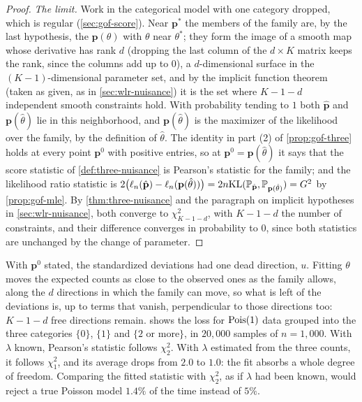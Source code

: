 \begin{proof}
\textit{The limit.}
Work in the categorical model with one category dropped, which is regular (\cref{sec:gof-score}).
Near $\mathbf{p}^*$ the members of the family are, by the last hypothesis, the $\mathbf{p}(\theta)$ with $\theta$ near $\theta^*$; they form the image of a smooth map whose derivative has rank $d$ (dropping the last column of the $d \times K$ matrix keeps the rank, since the columns add up to $0$), a $d$-dimensional surface in the $(K-1)$-dimensional parameter set, and by the implicit function theorem (taken as given, as in \cref{sec:wlr-nuisance}) it is the set where $K - 1 - d$ independent smooth constraints hold.
With probability tending to $1$ both $\hat{\mathbf{p}}$ and $\mathbf{p}(\hat{\theta})$ lie in this neighborhood, and $\mathbf{p}(\hat{\theta})$ is the maximizer of the likelihood over the family, by the definition of $\hat{\theta}$.
The identity in part (2) of \cref{prop:gof-three} holds at every point $\mathbf{p}^0$ with positive entries, so at $\mathbf{p}^0 = \mathbf{p}(\hat{\theta})$ it says that the score statistic of \cref{def:three-nuisance} is Pearson's statistic for the family; and the likelihood ratio statistic is $2\big(\ell_n(\hat{\mathbf{p}}) - \ell_n(\mathbf{p}(\hat{\theta}))\big) = 2n\mathrm{KL}(\mathbb{P}_{\hat{\mathbf{p}}}, \mathbb{P}_{\mathbf{p}(\hat{\theta})}) = G^2$ by \cref{prop:gof-mle}.
By \cref{thm:three-nuisance} and the paragraph on implicit hypotheses in \cref{sec:wlr-nuisance}, both converge to $\chi^2_{K-1-d}$, with $K - 1 - d$ the number of constraints, and their difference converges in probability to $0$, since both statistics are unchanged by the change of parameter.
\end{proof}

\begin{intuition}
With $\mathbf{p}^0$ stated, the standardized deviations had one dead direction, $u$.
Fitting $\theta$ moves the expected counts as close to the observed ones as the family allows, along the $d$ directions in which the family can move, so what is left of the deviations is, up to terms that vanish, perpendicular to those directions too: $K - 1 - d$ free directions remain.
 shows the loss for $\text{Pois}(1)$ data grouped into the three categories $\{0\}$, $\{1\}$ and $\{2 \text{ or more}\}$, in $20{,}000$ samples of $n = 1{,}000$.
With $\lambda$ known, Pearson's statistic follows $\chi^2_2$.
With $\lambda$ estimated from the three counts, it follows $\chi^2_1$, and its average drops from $2.0$ to $1.0$: the fit absorbs a whole degree of freedom.
Comparing the fitted statistic with $\chi^2_2$, as if $\lambda$ had been known, would reject a true Poisson model $1.4\%$ of the time instead of $5\%$.
\end{intuition}

